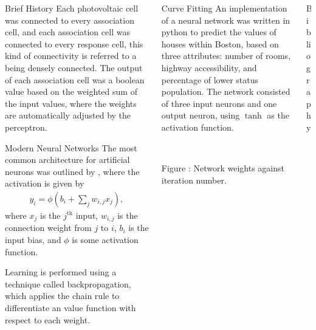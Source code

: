 \documentclass[final]{beamer}
\newcommand{\rfig}[3][1em]{%
    \refstepcounter{figure}
    \vspace{1cm}
    \begin{center}
        #2
        \vspace{#1}\\
        \parbox{0.8\columnwidth}{\centering Figure \thefigure: #3}
    \end{center}
    \vspace{1cm}
}
\begin{document}
\begin{frame}[t]
\begin{columns}
\begin{column}[t]{0.3\textwidth}
\begin{block}{Brief History}
        Each photovoltaic cell was connected to every association cell, and each
        association cell was connected to every response cell, this kind of
        connectivity is referred to a being densely connected.
        The output of each association cell was a boolean value based on the
        weighted sum of the input values, where the weights are automatically
        adjusted by the perceptron.
    \end{block}
    \vspace{1cm}
    \begin{block}{Modern Neural Networks}
        The most common architecture for artificial neurons was outlined by
        \cite{McClelland:1986:Parallel}, where the activation is given by
        \begin{align*}
            y_i = \phi\left(b_i + \sum_j w_{i,j}x_j\right),
        \end{align*}
        where $x_j$ is the $j^\text{th}$ input, $w_{i,j}$ is the connection
        weight from $j$ to $i$, $b_i$ is the input bias, and $\phi$ is some
        activation function.

        Learning is performed using a technique called backpropagation, which
        applies the chain rule to differentiate an value function with respect
        to each weight.
    \end{block}

\end{column}
\begin{column}[t]{0.3\textwidth}

    \begin{block}{Curve Fitting}
        An implementation of a neural network was written in python to predict
        the values of houses within Boston, based on three attributes:
        number of rooms, highway accessibility, and percentage of lower status
        population.
        The network consisted of three input neurons and one output neuron,
        using $\tanh$ as the activation function.
        \rfig[-1ex]{}{%
            Network weights against iteration number.
        }
    \end{block}

\end{column}
\begin{column}[t]{0.3\textwidth}

    \begin{block}{Bibliography}
        \linespread{1}
        \printbibliography
    \end{block}

\end{column}
\end{columns}
\end{frame}
\end{document}
